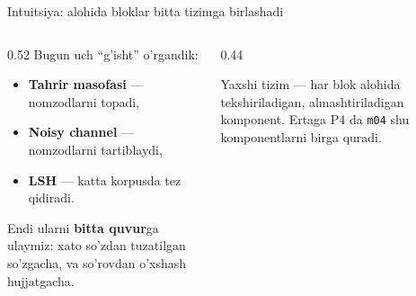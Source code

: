 \documentclass[aspectratio=169,11pt]{beamer}
\begin{document}
\begin{frame}{Intuitsiya: alohida bloklar bitta tizimga birlashadi}
  \begin{columns}[T]
    \begin{column}{0.52\textwidth}
      \small
      Bugun uch ``g'isht'' o'rgandik:
      \begin{itemize}\setlength\itemsep{2pt}
        \item \textbf{Tahrir masofasi} --- nomzodlarni topadi,
        \item \textbf{Noisy channel} --- nomzodlarni tartiblaydi,
        \item \textbf{LSH} --- katta korpusda tez qidiradi.
      \end{itemize}
      \vspace{4pt}
      Endi ularni \textbf{bitta quvur}ga ulaymiz: xato so'zdan tuzatilgan
      so'zgacha, va so'rovdan o'xshash hujjatgacha.
    \end{column}
    \begin{column}{0.44\textwidth}
      \begin{tcolorbox}[okbox,top=2pt,bottom=2pt]
        \footnotesize
        Yaxshi tizim --- har blok alohida tekshiriladigan, almashtiriladigan
        komponent. Ertaga P4 da \texttt{m04} shu komponentlarni birga
        quradi.
      \end{tcolorbox}
    \end{column}
  \end{columns}
\end{frame}
\end{document}
